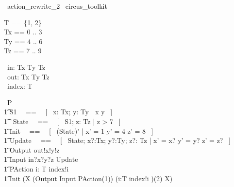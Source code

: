 % 
\begin{zsection}
  \SECTION\ action\_rewrite\_2 \parents\ circus\_toolkit
\end{zsection}

\begin{zed}
    T == \{1, 2\} \\
	Tx == 0 .. 3 \\ 
	Ty == 4 .. 6 \\ 
	Tz == 7 .. 9 \\ 
\end{zed}

\begin{circus}
	\circchannel\ in: Tx \cross Ty \cross Tz \\
	\circchannel\ out: Tx \cross Ty \cross Tz \\
	\circchannel\ index: T \\
\end{circus}

\begin{circus}
    \circprocess\ P \circdef \circbegin \\
        \t1 S1 ~~==~~ [~  x: Tx; y: Ty | x  \land y  ~] \\
        \t1 \circstate\ State ~~==~~ [~ S1; z: Tz | z > 7 ~] \\
        \t1 Init ~~==~~ [~ (State)' | x' = 1 \land y' = 4 \land z' = 8 ~] \\
        \t1 Update ~~==~~ [~ \Delta State; x?:Tx; y?:Ty; z?: Tz | x' = x? \land y' = y? \land z' = z? ~] \\
        \t1 Output \circdef out!x!y!z \then \Skip \\
        \t1 Input \circdef in?x?y?z \then \lschexpract Update \rschexpract \\
        \t1 PAction \circdef i: T \circspot index!i \then \Skip \\
        \t1 \circspot \lschexpract Init \rschexpract \circseq (\circmu X \circspot (Output \extchoice Input \intchoice PAction(1)) \circseq (i:T \circspot index!i \then \Skip)(2) \circseq X) \\ 
	\circend
\end{circus}


